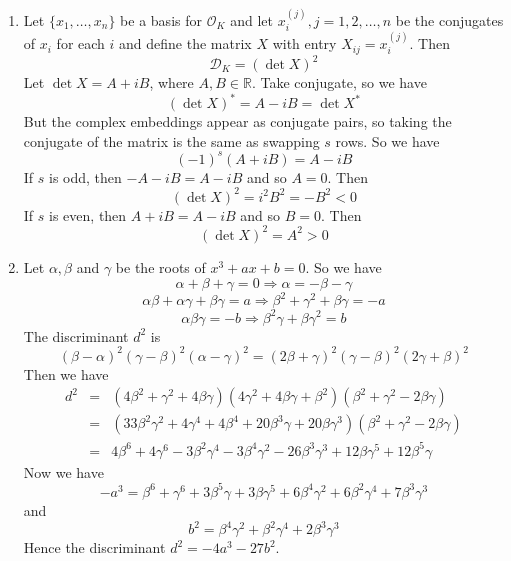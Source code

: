 \begin{enumerate}
\item Let $\{x_1,\ldots,x_n\}$ be a basis for $\mathcal{O}_K$ and let $x^{(j)}_i,j=1,2,\ldots,n$ be the conjugates of $x_i$ for each $i$ and define the matrix $X$ with entry $X_{ij}=x^{(j)}_i$. Then
    $$\mathcal{D}_K=(\det{X})^2$$
      Let $\det{X}=A+iB$, where $A,B \in \mathbb{R}$. Take conjugate, so we have
    $$(\det{X})^*=A-iB=\det{X^*}$$
    But the complex embeddings appear as conjugate pairs, so taking the conjugate of the matrix is the same
    as swapping $s$ rows. So we have
    $$(-1)^s (A+iB)=A-iB$$
    If $s$ is odd, then $-A-iB=A-iB$ and so $A=0$. Then
    $$(\det{X})^2=i^2 B^2=-B^2<0$$
    If $s$ is even, then $A+iB=A-iB$ and so $B=0$. Then
    $$(\det{X})^2=A^2>0$$
\item Let $\alpha,\beta$ and $\gamma$ be the roots of $x^3+ax+b=0$. So we have
    $$\alpha+\beta+\gamma=0 \Rightarrow \alpha=-\beta-\gamma$$
    $$\alpha\beta+\alpha\gamma+\beta\gamma=a \Rightarrow \beta^2+\gamma^2+\beta\gamma=-a$$
    $$\alpha \beta \gamma =-b \Rightarrow \beta^2 \gamma+\beta \gamma^2 =b$$
    The discriminant $d^2$ is
    $$(\beta-\alpha)^2(\gamma-\beta)^2(\alpha-\gamma)^2=(2\beta+\gamma)^2(\gamma-\beta)^2(2\gamma+\beta)^2$$
    Then we have
    \begin{eqnarray*}
    d^2&=&(4\beta^2+\gamma^2+4\beta\gamma)(4\gamma^2+4\beta\gamma+\beta^2)(\beta^2+\gamma^2-2\beta\gamma)\\
    &=&(33\beta^2\gamma^2+4\gamma^4+4\beta^4+20\beta^3\gamma+20\beta\gamma^3)(\beta^2+\gamma^2-2\beta\gamma)\\
    &=&4\beta^6+4\gamma^6-3\beta^2\gamma^4-3\beta^4\gamma^2-26\beta^3\gamma^3+12\beta\gamma^5+12\beta^5\gamma
    \end{eqnarray*}
    Now we have
    $$-a^3=\beta^6+\gamma^6+3\beta^5\gamma+3\beta\gamma^5+6\beta^4\gamma^2+6\beta^2\gamma^4+7\beta^3\gamma^3$$
    and
    $$b^2=\beta^4\gamma^2+\beta^2\gamma^4+2\beta^3\gamma^3$$
    Hence the discriminant $d^2=-4a^3-27b^2$.


\end{enumerate}
